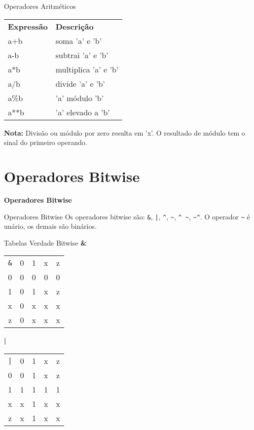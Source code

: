 \documentclass[aspectratio=169,xcolor=dvipsnames]{beamer}
\begin{document}
\begin{frame}[fragile]{Operadores Aritméticos}
\begin{tabular}{ll}
\textbf{Expressão} & \textbf{Descrição} \\
a+b & soma 'a' e 'b' \\
a-b & subtrai 'a' e 'b' \\
a*b & multiplica 'a' e 'b' \\
a/b & divide 'a' e 'b' \\
a\%b & 'a' módulo 'b' \\
a**b & 'a' elevado a 'b' \\
\end{tabular}

\textbf{Nota:} Divisão ou módulo por zero resulta em 'x'. O resultado de módulo tem o sinal do primeiro operando.
\end{frame}

\section{Operadores Bitwise}

\begin{frame}
    \Huge{\centerline{\textbf{Operadores Bitwise}}}
\end{frame}

\begin{frame}[fragile]{Operadores Bitwise}
Os operadores bitwise são: \texttt{\&}, \texttt{|}, \texttt{\^}, \texttt{\textasciitilde}, \texttt{\^{} \textasciitilde}, \texttt{\textasciitilde\^{}}. O operador \texttt{\textasciitilde} é unário, os demais são binários.
\end{frame}

\begin{frame}[fragile]{Tabelas Verdade Bitwise}
\textbf{\&}
\begin{tabular}{ccccc}
\texttt{\&} & 0 & 1 & x & z \\
0 & 0 & 0 & 0 & 0 \\
1 & 0 & 1 & x & z \\
x & 0 & x & x & x \\
z & 0 & x & x & x \\
\end{tabular}

\vspace{1em}
\textbf{|}
\begin{tabular}{ccccc}
\texttt{|} & 0 & 1 & x & z \\
0 & 0 & 1 & x & z \\
1 & 1 & 1 & 1 & 1 \\
x & x & 1 & x & x \\
z & x & 1 & x & x \\
\end{tabular}
\end{frame}
\end{document}
